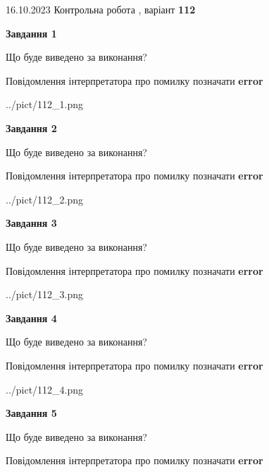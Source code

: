 \documentclass[12pt, ukrainian]{article}
\begin{document}
{\Large{16.10.2023 Контрольна робота , варіант  \No \textbf { 112 }\par}}
{
\begin {large}
{\begin {center}\textbf{Завдання 1}\end {center}}\par
Що буде виведено за виконання? \par
Повідомлення інтерпретатора про помилку позначати \textbf{error}

\begin{center}
	{../pict/112_1.png}
\end{center}
\newpage

{\begin {center}\textbf{Завдання 2}\end {center}}\par
Що буде виведено за виконання? \par
Повідомлення інтерпретатора про помилку позначати \textbf{error}

\begin{center}
	{../pict/112_2.png}
\end{center}
\newpage

{\begin {center}\textbf{Завдання 3}\end {center}}\par
Що буде виведено за виконання? \par
Повідомлення інтерпретатора про помилку позначати \textbf{error}

\begin{center}
	{../pict/112_3.png}
\end{center}
\newpage

{\begin {center}\textbf{Завдання 4}\end {center}}\par
Що буде виведено за виконання? \par
Повідомлення інтерпретатора про помилку позначати \textbf{error}

\begin{center}
	{../pict/112_4.png}
\end{center}
\newpage

{\begin {center}\textbf{Завдання 5}\end {center}}\par
Що буде виведено за виконання? \par
Повідомлення інтерпретатора про помилку позначати \textbf{error}


\end{large}}
\end{document}
